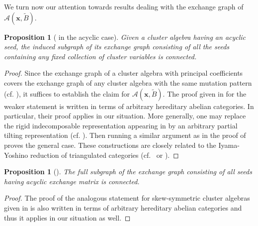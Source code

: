\documentclass[12pt]{amsart}
\newtheorem{proposition}[theorem]{Proposition}
\newcommand{\bfx}{\mathbf{x}}
\newcommand{\cA}{\mathcal{A}}
\begin{document}
  We turn now our attention towards results dealing with the exchange graph of $\cA(\bfx,\widetilde{B})$.

  \begin{proposition}[{\cite[Conjecture 3.10]{reading-speyer}} in the acyclic case]
    Given a cluster algebra having an acyclic seed, the induced subgraph of its exchange graph consisting of all the seeds containing any fixed collection of cluster variables is connected.
  \end{proposition}
  \begin{proof}
    Since the exchange graph of a cluster algebra with principal coefficients covers the exchange graph of any cluster algebra with the same mutation pattern (cf. \cite{fomin-zelevinsky4}), it suffices to establish the claim for $\cA(\bfx,\widetilde{B})$.
    The proof given in \cite[Corollary 3]{caldero-keller2} for the weaker statement \cite[Conjecture 4.14(3)]{FZ03} is written in terms of arbitrary hereditary abelian categories.
    In particular, their proof applies in our situation.
    More generally, one may replace the rigid indecomposable representation appearing in \cite[Section 5.4]{caldero-keller2} by an arbitrary partial tilting representation (cf. \cite[Proposition 3]{happel-rickard-schofield}).
    Then running a similar argument as in the proof of \cite[Theorem 6]{caldero-keller2} proves the general case.
    These constructions are closely related to the Iyama-Yoshino reduction of triangulated categories (cf.~\cite[Section 4]{iyama-yoshino} or \cite[Section 7.2]{keller}).
  \end{proof}

  \begin{proposition}[{\cite[Conjecture 4.14(4)]{FZ03}}]
    The full subgraph of the exchange graph consisting of all seeds having acyclic exchange matrix is connected.
  \end{proposition}
  \begin{proof}
    The proof of the analogous statement for skew-symmetric cluster algebras given in \cite[Corollary 4]{caldero-keller2} is also written in terms of arbitrary hereditary abelian categories and thus it applies in our situation as well.
  \end{proof}

%
%
\end{document}
